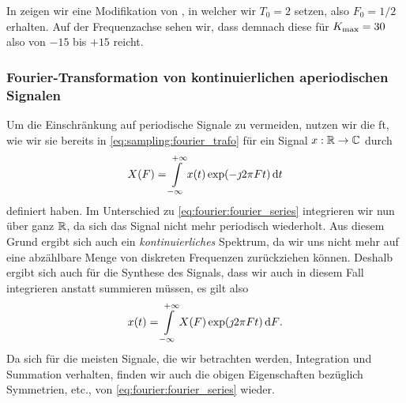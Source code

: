 In  zeigen wir eine Modifikation von , in welcher wir $T_0 = 2$ setzen, also $F_0=1/2$ erhalten. 
Auf der Frequenzachse sehen wir, dass demnach diese für $K_{\rm max} = 30$ also von $-15$ bis $+15$ reicht.
%
%
\FloatBarrier
\subsubsection{Fourier-Transformation von kontinuierlichen aperiodischen Signalen}
%
Um die Einschränkung auf periodische Signale zu vermeiden, nutzen wir die \acrlong{ft}, wie wir sie bereits in \eqref{eq:sampling:fourier_trafo} für ein Signal $x : \mathbb{R} \rightarrow \mathbb{C}$ durch
\begin{equation}\label{eq:fourier:fourier_trafo}
    X(F) = {\int\limits_{-\infty}^{+\infty}{x(t) \exp(-\jmath 2 \pi F t)}\,\mathrm{d}{t}}
\end{equation}
definiert haben.
Im Unterschied zu \eqref{eq:fourier:fourier_series} integrieren wir nun über ganz $\mathbb{R}$, da sich das Signal nicht mehr periodisch wiederholt.
Aus diesem Grund ergibt sich auch ein \emph{kontinuierliches} Spektrum, da wir uns nicht mehr auf eine abzählbare Menge von diskreten Frequenzen zurückziehen können.
Deshalb ergibt sich auch für die Synthese des Signals, dass wir auch in diesem Fall integrieren anstatt summieren müssen, es gilt also
\begin{equation}\label{eq:fourier:inv_fourier_trafo}
    x(t) = {\int\limits_{-\infty}^{+\infty}{X(F) \exp(\jmath 2 \pi F t)}\,\mathrm{d}{F}}.
\end{equation}
Da sich für die meisten Signale, die wir betrachten werden, Integration und Summation  verhalten, finden wir auch die obigen Eigenschaften bezüglich Symmetrien, etc., von \eqref{eq:fourier:fourier_series} wieder.

